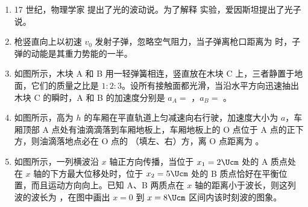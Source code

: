 \documentclass[\gkver]{gaokaozhenti}
\begin{document}
\begin{enumerate}
\item
17 世纪，物理学家  提出了光的波动说。为了解释  实验，爱因斯坦提出了光子说。

\item
枪竖直向上以初速 $v_{0}$ 发射子弹，忽略空气阻力，当子弹离枪口距离为  时，子弹的动能是其重力势能的一半。

\item
如图所示，木块 A 和 B 用一轻弹簧相连，竖直放在木块 C 上，三者静置于地面，它们的质量之比是 $1:2:3$。设所有接触面都光滑，当沿水平方向迅速抽出木块 C 的瞬时，A 和 B 的加速度分别是 $a_{A} =$ ，$a_{B} =$ 。
\onepicture[align=right, h=2.65cm]{}

\item
如图所示，高为 $h$ 的车厢在平直轨道上匀减速向右行驶，加速度大小为 $a$，车厢顶部 A 点处有油滴滴落到车厢地板上，车厢地板上的 O 点位于 A 点的正下方，则油滴落地点必在 O 点的 （填左、右）方，离 O 点距离为 。
\onepicture[align=right, w=4.05cm]{}

\item
如图所示，一列横波沿 $x$ 轴正方向传播，当位于 $x_{1} = 2\Ucm$ 处的 A 质点处在 $x$ 轴的下方最大位移处时，位于 $x_{2} = 5\Ucm$ 处的 B 质点恰好在平衡位置，而且运动方向向上。已知 A、B 两质点在 $x$ 轴的距离小于波长，则这列波的波长为 \tkanswer[1.8cm]{$4\Ucm$}，在图中画出 $x = 0$ 到 $x = 8\Ucm$ 区间内该时刻波的图象。
\onepicture[align=right, w=4.63cm]{}
\jdanswer{
\begin{enumerate}
	\item
	$4\Ucm$


\end{enumerate}}
\end{enumerate}
\end{document}
